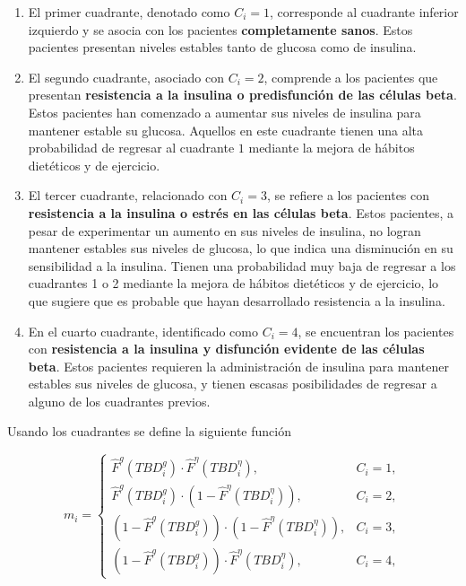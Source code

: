 \begin{enumerate}
    \item El primer cuadrante, denotado como $C_i = 1$, corresponde al cuadrante inferior izquierdo y se asocia con los pacientes \textbf{completamente sanos}. Estos pacientes presentan niveles estables tanto de glucosa como de insulina.
    \item El segundo cuadrante, asociado con $C_i = 2$, comprende a los pacientes que presentan \textbf{resistencia a la insulina o predisfunción de las células beta}. Estos pacientes han comenzado a aumentar sus niveles de insulina para mantener estable su glucosa. Aquellos en este cuadrante tienen una alta probabilidad de regresar al cuadrante $1$ mediante la mejora de hábitos dietéticos y de ejercicio.
    \item El tercer cuadrante, relacionado con $C_i = 3$, se refiere a los pacientes con \textbf{resistencia a la insulina o estrés en las células beta}. Estos pacientes, a pesar de experimentar un aumento en sus niveles de insulina, no logran mantener estables sus niveles de glucosa, lo que indica una disminución en su sensibilidad a la insulina. Tienen una probabilidad muy baja de regresar a los cuadrantes 1 o 2 mediante la mejora de hábitos dietéticos y de ejercicio, lo que sugiere que es probable que hayan desarrollado resistencia a la insulina.
    \item En el cuarto cuadrante, identificado como $C_i = 4$, se encuentran los pacientes con \textbf{resistencia a la insulina y disfunción evidente de las células beta}. Estos pacientes requieren la administración de insulina para mantener estables sus niveles de glucosa, y tienen escasas posibilidades de regresar a alguno de los cuadrantes previos.
\end{enumerate}

Usando los cuadrantes se define la siguiente función

\begin{equation}
    m_i= \begin{cases}
    \widehat{F}^g\left(T B D_i^g\right) \cdot \widehat{F}^\eta\left(T B D_i^\eta\right), & C_i=1, \\ \widehat{F}^g\left(T B D_i^g\right) \cdot\left(1-\widehat{F}^\eta\left(T B D_i^\eta\right)\right), & C_i=2, \\ \left(1-\widehat{F}^g\left(T B D_i^g\right)\right) \cdot\left(1-\widehat{F}^\eta\left(T B D_i^\eta\right)\right), & C_i=3, \\ \left(1-\widehat{F}^g\left(T B D_i^g\right)\right) \cdot \widehat{F}^\eta\left(T B D_i^\eta\right), & C_i=4,\end{cases}
\end{equation}


